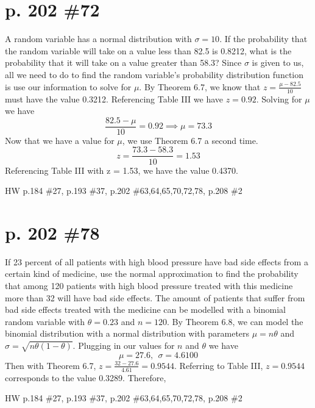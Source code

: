 \documentclass[12pt]{article}
\begin{document}
	\section[20pt]{p. 202 \#72}
	A random variable has a normal distribution with \(\sigma=10\). If the probability that the random variable will take on a value less than 82.5 is 0.8212, what is the probability that it will take on a value greater than 58.3? \newline \newline
	Since \(\sigma\) is given to us, all we need to do to find the random variable's probability distribution function is use our information to solve for \(\mu\).
	\newline \newline
	By Theorem 6.7, we know that \(z=\frac{\mu-82.5}{10}\) must have the value 0.3212. \newline \newline
	Referencing Table III we have \(z=0.92\). \newline
	Solving for \(\mu\) we have
	\[\frac{82.5-\mu}{10}=0.92 \implies \mu=73.3\]
	Now that we have a value for \(\mu\), we use Theorem 6.7 a second time.
	\[z=\frac{73.3-58.3}{10}=1.53\]
	Referencing Table III with z = 1.53, we have the value 0.4370. \newline
	\newpage
	\maketitle HW p.184 \#27, p.193 \#37, p.202 \#63,64,65,70,72,78, p.208 \#2
	\section[20pt]{p. 202 \#78}
	If 23 percent of all patients with high blood pressure have bad side effects from a certain kind of medicine, use the normal approximation to find the probability that among 120 patients with high blood pressure treated with this medicine more than 32 will have bad side effects. \newline \newline
	The amount of patients that suffer from bad side effects treated with the medicine can be modelled with a binomial random variable with \(\theta=0.23\) and \(n=120\). \newline \newline
	By Theorem 6.8, we can model the binomial distribution with a normal distribution with parameters \(\mu=n\theta\) and \(\sigma=\sqrt{n\theta(1-\theta)}\).
	\newline
	Plugging in our values for \(n\) and \(\theta\) we have
	\[\mu=27.6,\ \ \sigma=4.6100\]
	Then with Theorem 6.7, \(z=\frac{32-27.6}{4.61}=0.9544\).
	Referring to Table III, \(z=0.9544\) corresponds to the value 0.3289. Therefore, \newline
	\newpage
	\maketitle HW p.184 \#27, p.193 \#37, p.202 \#63,64,65,70,72,78, p.208 \#2
\end{document}
